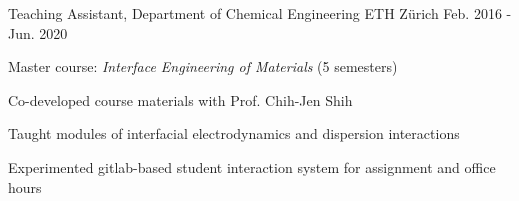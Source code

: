 

\begin{cventries}
\cventry
{Teaching Assistant, Department of Chemical Engineering} %
{ETH Z\"{u}rich} %
{} %
{Feb. 2016 - Jun. 2020} %
{
Master course: \textit{Interface Engineering of Materials} (5 semesters)
\vspace{1em}
\begin{cvitems}
\item Co-developed course materials with Prof. Chih-Jen Shih
\item Taught modules of interfacial electrodynamics and dispersion interactions
\item Experimented gitlab-based student interaction system for assignment and office hours
\end{cvitems}
}


   
\end{cventries}

